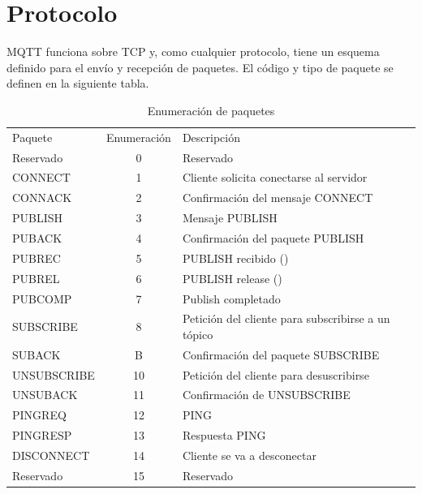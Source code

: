 \documentclass[12pt, twoside]{book}
\begin{document}
\section{Protocolo}
MQTT funciona sobre TCP y, como cualquier protocolo, tiene un esquema definido para el envío y recepción de paquetes. El código y tipo de paquete se definen en la siguiente tabla.
\begin{table}[H]
\centering
\begin{tabular}{lcl}
\rowcolor[HTML]{00D2CB} 
Paquete     & Enumeración & Descripción                                        \\
Reservado   & 0           & Reservado                                          \\
CONNECT     & 1           & Cliente solicita conectarse al servidor            \\
CONNACK     & 2           & Confirmación del mensaje CONNECT                   \\
PUBLISH     & 3           & Mensaje PUBLISH                                    \\
PUBACK      & 4           & Confirmación del paquete PUBLISH                   \\
PUBREC      & 5           & PUBLISH recibido ()                                \\
PUBREL      & 6           & PUBLISH release ()                                 \\
PUBCOMP     & 7           & Publish completado                                 \\
SUBSCRIBE   & 8           & Petición del cliente para subscribirse a un tópico \\
SUBACK      & B           & Confirmación del paquete SUBSCRIBE                 \\
UNSUBSCRIBE & 10          & Petición del cliente para desuscribirse            \\
UNSUBACK    & 11          & Confirmación de UNSUBSCRIBE                        \\
PINGREQ     & 12          & PING                                               \\
PINGRESP    & 13          & Respuesta PING                                     \\
DISCONNECT  & 14          & Cliente se va a desconectar                        \\
Reservado   & 15          & Reservado                                         
\end{tabular}
\caption{Enumeración de paquetes}
\label{table:package}
\end{table}
\end{document}

